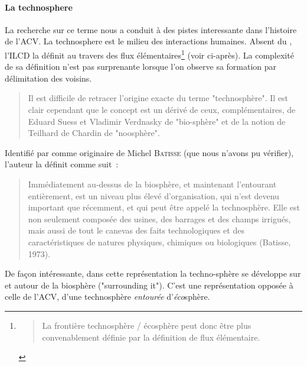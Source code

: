 \paragraph{La \gls{technosphere}} La recherche sur ce terme nous a conduit à des pistes interessante dans l'histoire de l'ACV. La \gls{technosphere} est le milieu des interactions humaines.
Absent du , l'\gls{ILCD} la définit au travers des flux élémentaires\footnote{\blockcquote[traduction]{european_commission_ilcd_2010}{
La frontière technosphère / écosphère peut donc être plus convenablement définie par la définition de flux élémentaire.
}} (voir ci-après).
La complexité de sa définition n'est pas surprenante lorsque l'on observe sa formation par délimitation des voisins.
\blockcquote[traduction]{bruni_cognitive_2011}{Il est difficile de retracer l'origine exacte du terme "technosphère".
Il est clair cependant que le concept est un dérivé de ceux, complémentaires, de Eduard Suess et Vladimir Verdnasky de "bio-sphère" et de la notion de Teilhard de Chardin de "noosphère".}
%
Identifié par \citeauthor{bruni_cognitive_2011,} comme originaire de Michel \textsc{Batisse} (que nous n'avons pu vérifier), l'auteur la définit comme suit~:
\blockcquote[traduction]{bruni_cognitive_2011}{
Immédiatement au-dessus de la biosphère, et maintenant l'entourant entièrement, est un niveau plus élevé d'organisation, qui n'est devenu important que récemment, et qui peut être appelé la technosphère.
Elle est non seulement composée des usines, des barrages et des champs irrigués, mais aussi de tout le canevas des faits technologiques et des caractéristiques de natures physiques, chimiques ou biologiques (Batisse, 1973).}
De façon intéressante, dans cette représentation la techno-sphère se développe sur et autour de la biosphère ("surrounding it").
C'est une représentation opposée à celle de l'ACV, d'une technosphère \emph{entourée} d'\emph{éco}sphère.

